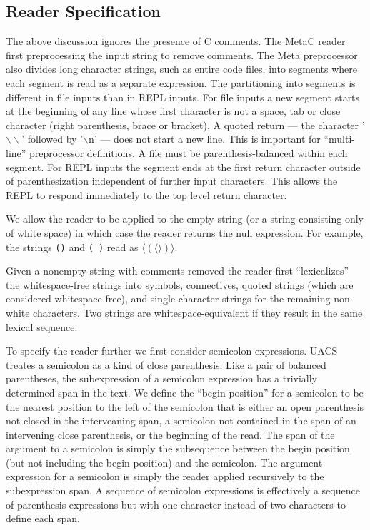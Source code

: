 \documentclass{article}
\begin{document}
\subsection{Reader Specification}
\label{sec:reader}

The above discussion ignores the presence of C comments. The MetaC reader first preprocessing the input string to remove comments.
The Meta preprocessor also divides long character strings, such as entire code files, into segments where each segment is read as a separate expression.
The partitioning into segments is different in file inputs than in REPL inputs.
For file inputs a new segment starts at the beginning of any line whose first character is not a space, tab or close character (right parenthesis, brace or bracket).
A quoted return --- the character '$\backslash\backslash$' followed by '$\backslash$n' --- does not start a new line.  This is important for ``multi-line'' preprocessor definitions.
A file must be parenthesis-balanced within each segment.
For REPL inputs the segment ends at the first return character outside of parenthesization independent of further input characters.  This allows the REPL to respond immediately
to the top level return character.

We allow the reader to be applied to the empty string (or a string consisting only of white space) in which case the reader returns the null expression.
For example, the strings {\tt ()} and {\tt ( )} read as $\langle(\langle \rangle)\rangle$.

Given a nonempty string with comments removed the reader first ``lexicalizes'' the whitespace-free strings into symbols, connectives, quoted strings (which are considered whitespace-free),
and single character strings for the remaining non-white characters. Two strings are whitespace-equivalent if they result in the same lexical sequence.

To specify the reader further we first consider semicolon expressions.  UACS treates a semicolon as a kind of close parenthesis.
Like a pair of balanced parentheses, the subexpression of a semicolon expression has a trivially determined
span in the text. We define the ``begin position'' for a semicolon to be the nearest position to the left
of the semicolon that is either an open parenthesis not closed in the interveaning span, a semicolon not contained in the span of an intervening close parenthesis,
or the beginning of the read.
The span of the argument to a semicolon is simply the subsequence between the begin position (but not including the begin position) and the semicolon.
The argument expression for a semicolon is simply the reader applied recursively to the subexpression span.
A sequence of semicolon expressions is effectively a sequence of parenthesis expressions but with one character instead of two characters to define each span.
\end{document}
